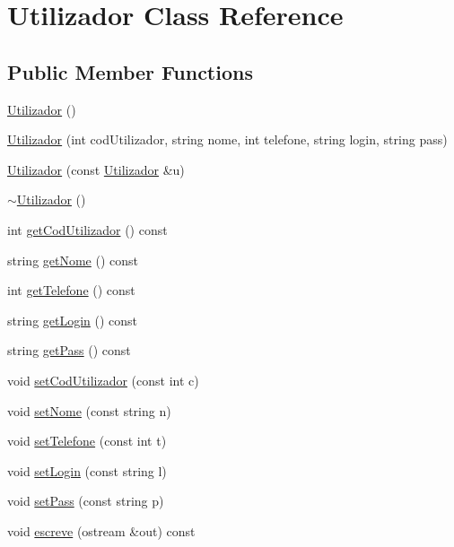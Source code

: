 \hypertarget{class_utilizador}{\section{Utilizador Class Reference}
\label{class_utilizador}
}
\subsection*{Public Member Functions}
\begin{DoxyCompactItemize}
\item 
\hyperlink{class_utilizador_a264cb21da71b44fc2d5cfb21e58fa24a}{Utilizador} ()
\item 
\hyperlink{class_utilizador_ae29494a5b6d151693b8630907841b831}{Utilizador} (int cod\-Utilizador, string nome, int telefone, string login, string pass)
\item 
\hyperlink{class_utilizador_ae739e37f32def24f9306851089334efe}{Utilizador} (const \hyperlink{class_utilizador}{Utilizador} \&u)
\item 
\hyperlink{class_utilizador_aa0c2432b0a0f7b64ca5e7232ceec2869}{$\sim$\-Utilizador} ()
\item 
int \hyperlink{class_utilizador_a6d30770baa37a94cf2a0a91deaccc956}{get\-Cod\-Utilizador} () const 
\item 
string \hyperlink{class_utilizador_aa5af9c1385b0a93116dd8a80264b887a}{get\-Nome} () const 
\item 
int \hyperlink{class_utilizador_aba39b7cda82e58428775a729e140661a}{get\-Telefone} () const 
\item 
string \hyperlink{class_utilizador_ad6c565c391bd19de3462e50a4e05c9a6}{get\-Login} () const 
\item 
string \hyperlink{class_utilizador_a034c7e6e5105b6f7465398b14531b0a3}{get\-Pass} () const 
\item 
void \hyperlink{class_utilizador_acb164553461c562b211cd4099b44a229}{set\-Cod\-Utilizador} (const int c)
\item 
void \hyperlink{class_utilizador_a80476f48d9fed81d2a24801f91edea01}{set\-Nome} (const string n)
\item 
void \hyperlink{class_utilizador_a92f483195ee9aaae73e5272c0a8579f3}{set\-Telefone} (const int t)
\item 
void \hyperlink{class_utilizador_a3f30628337236b7af7d734681c3fc73d}{set\-Login} (const string l)
\item 
void \hyperlink{class_utilizador_a629a40d3ff997e9128cc817e4a7b009e}{set\-Pass} (const string p)
\item 
void \hyperlink{class_utilizador_a6b008631a6fc01e708945335959e176f}{escreve} (ostream \&out) const 
\end{DoxyCompactItemize}


